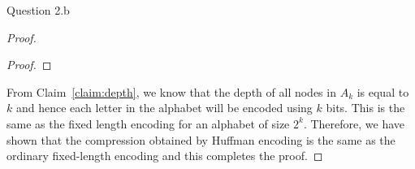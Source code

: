 \begin{solution}{Question 2.b}
\begin{proof}
\begin{proof}
        \end{proof}
        From Claim~\ref{claim:depth}, we know that the depth of all nodes in $A_k$ is equal to $k$ and hence each letter in the alphabet will be encoded using $k$ bits. This is the same as the fixed length encoding for an alphabet of size $2^k$. Therefore, we have shown that the compression obtained by Huffman encoding is the same as the ordinary fixed-length encoding and this completes the proof.
    \end{proof}
\end{solution}
